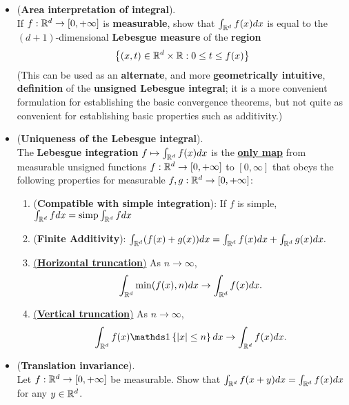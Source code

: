 \documentclass[11pt]{article}
\begin{document}
\begin{itemize}
\item \begin{exercise}(\textbf{Area interpretation of integral}). \\
If $f : {\mathbb R}^d \rightarrow [0,+\infty]$ is \textbf{measurable}, show that $\int_{{\mathbb R}^d} f(x) dx$ is equal to the $(d+1)$-dimensional \textbf{Lebesgue measure} of the \textbf{region}
\begin{align*}
\left\{(x, t) \in {\mathbb R}^d \times {\mathbb R}: 0 \le t \le f(x)\right\}
\end{align*}
(This can be used as an \textbf{alternate}, and more \textbf{geometrically intuitive}, \textbf{definition} of the \textbf{unsigned Lebesgue integral}; it is a more convenient formulation for establishing the basic convergence theorems, but not quite as convenient for establishing basic properties such as additivity.) 
\end{exercise}

\item \begin{proposition} (\textbf{Uniqueness of the Lebesgue integral}). \\
The \textbf{Lebesgue integration} $f \mapsto \int_{{\mathbb R}^d}f(x) dx$  is the \underline{\textbf{only map}} from measurable unsigned functions $f : {\mathbb R}^d \rightarrow [0,+\infty]$ to $[0,\infty]$ that obeys the following properties for measurable $f, g : {\mathbb R}^d \rightarrow [0,+\infty]$:
\begin{enumerate}
\item (\textbf{Compatible with simple integration}): If $f$ is simple, $\int_{{\mathbb R}^{d}}f dx = \text{simp}\int_{{\mathbb R}^{d}}f dx$
\item (\textbf{Finite Additivity}): $\int_{{\mathbb R}^{d}}(f(x)+g(x))dx = \int_{{\mathbb R}^{d}}f(x)dx+ \int_{{\mathbb R}^{d}}g(x)dx.$
\item \underline{(\textbf{Horizontal truncation})} As $n \rightarrow \infty$, 
\begin{align*}
\int_{{\mathbb R}^{d}}\min(f(x), n)dx \rightarrow \int_{{\mathbb R}^{d}}f(x)dx.
\end{align*}
\item \underline{(\textbf{Vertical truncation})} As  $n \rightarrow \infty$, 
\begin{align*}
\int_{\bR^{d}}f(x)\ind{\abs{x}\le n}dx \rightarrow \int_{\bR^{d}}f(x)dx.
\end{align*}
\end{enumerate}
\end{proposition}

\item \begin{exercise} (\textbf{Translation invariance}). \\
Let $f : {\mathbb R}^d \rightarrow [0,+\infty]$ be measurable. Show that $ \int_{{\mathbb R}^{d}}f(x + y)dx = \int_{{\mathbb R}^{d}}f(x)dx$ for any $y \in {\mathbb R}^d$.
\end{exercise}


\end{itemize}
\end{document}
